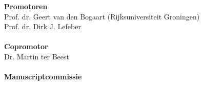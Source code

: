 
\newpage
\thispagestyle{empty}
\vspace{120pt}
\noindent \textbf{Promotoren}\\
\noindent Prof. dr. Geert van den Bogaart (Rijksuniversiteit Groningen)\\
\noindent Prof. dr. Dirk J. Lefeber\\
\noindent \\
\noindent \textbf{Copromotor}\\
\noindent Dr. Martin ter Beest\\
\noindent \\
\noindent \textbf{Manuscriptcommissie}\\
\noindent\\
\newpage
\rm


